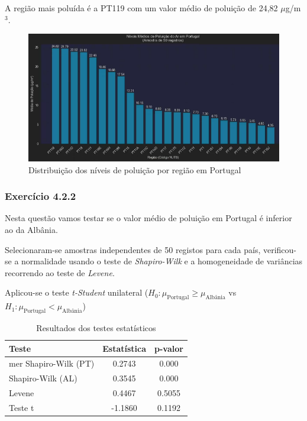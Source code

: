 \documentclass[conference]{IEEEtran}
\begin{document}
A região mais poluída é a PT119 com um valor médio de poluição de 24,82 $\mu$g/m$^3$.

\begin{figure}
	\centering
	\includegraphics[width=0.9\linewidth]{pol_portugal.png}
	\caption{Distribuição dos níveis de poluição por região em Portugal}
	\label{fig:polportugal}
\end{figure}

\medskip
\subsubsection{\textbf{Exercício 4.2.2}}

Nesta questão vamos testar se o valor médio de poluição em Portugal é inferior ao da Albânia.

Selecionaram-se amostras independentes de 50 registos para cada país, verificou-se a normalidade usando o teste de \textit{Shapiro-Wilk} e a  homogeneidade de variâncias recorrendo ao teste de \textit{Levene}. 

Aplicou-se o teste \textit{t-Student} unilateral ($H_{0}: \mu_{\text{Portugal}} \geq \mu_{\text{Albânia}}$ vs $H_{1}: \mu_{\text{Portugal}} < \mu_{\text{Albânia}}$)

	\begin{table}[H]
		\centering
		\caption{Resultados dos testes estatísticos}
		\begin{tabular}{lcc}
			\toprule
			Teste & Estatística & p-valor \\
			\midrule
mer			Shapiro-Wilk (PT) & 0.2743 & 0.000 \\
			Shapiro-Wilk (AL) & 0.3545 & 0.000 \\
			Levene & 0.4467 & 0.5055 \\
			Teste t & -1.1860 & 0.1192 \\
			\bottomrule
		\end{tabular}
	\end{table}
\end{document}
